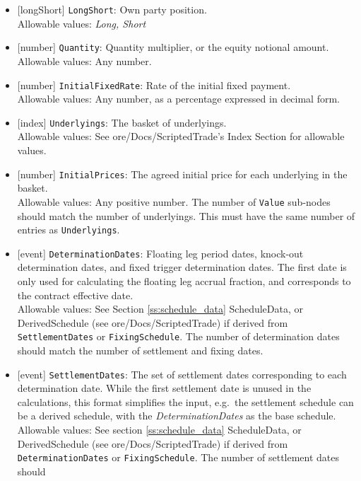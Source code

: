 \begin{itemize}
  \item{}[longShort] \lstinline!LongShort!: Own party position. \\
  Allowable values: \emph{Long, Short}
  \item{}[number] \lstinline!Quantity!: Quantity multiplier, or the equity notional amount. \\
  Allowable values: Any number.
  \item{}[number] \lstinline!InitialFixedRate!: Rate of the initial fixed payment. \\
  Allowable values: Any number, as a percentage expressed in decimal form.
  \item{}[index] \lstinline!Underlyings!: The basket of underlyings. \\
  Allowable values: See ore/Docs/ScriptedTrade's Index Section for allowable values.
  \item{}[number] \lstinline!InitialPrices!: The agreed initial price for each underlying in the basket. \\
  Allowable values: Any positive number. The number of \lstinline!Value! sub-nodes should match the number of underlyings.
  This must have the same number of entries as \lstinline!Underlyings!.
  \item{}[event] \lstinline!DeterminationDates!: Floating leg period dates, knock-out determination dates, and fixed trigger
  determination dates. The first date is only used for calculating the floating leg accrual fraction, and corresponds
  to the contract effective date. \\
  Allowable values: See Section \ref{ss:schedule_data} ScheduleData, or DerivedSchedule (see ore/Docs/ScriptedTrade) if
  derived from \lstinline!SettlementDates! or \lstinline!FixingSchedule!. The number of determination dates should
  match the number of settlement and fixing dates.
  \item{}[event] \lstinline!SettlementDates!: The set of settlement dates corresponding to each determination date. While the first
  settlement date is unused in the calculations, this format simplifies the input, e.g.\ the settlement schedule can be
  a derived schedule, with the \emph{DeterminationDates} as the base schedule. \\
  Allowable values: See section \ref{ss:schedule_data} ScheduleData, or DerivedSchedule (see ore/Docs/ScriptedTrade) if
  derived from \lstinline!DeterminationDates! or \lstinline!FixingSchedule!. The number of settlement dates should

\end{itemize}
